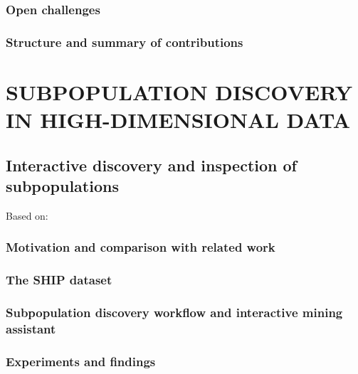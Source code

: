 \documentclass[
]{book}
\begin{document}
\hypertarget{open-challenges}{%
\section{Open challenges}\label{open-challenges}}

\hypertarget{structure-and-summary-of-contributions}{%
\section{Structure and summary of contributions}\label{structure-and-summary-of-contributions}}

\hypertarget{part-subpopulation-discovery-in-high-dimensional-data}{%
\part{SUBPOPULATION DISCOVERY IN HIGH-DIMENSIONAL DATA}\label{part-subpopulation-discovery-in-high-dimensional-data}}

\hypertarget{imm}{%
\chapter{Interactive discovery and inspection of subpopulations}\label{imm}}

Based on: \autocite{Niemann:ESWA2014}

\hypertarget{motivation-and-comparison-with-related-work}{%
\section{Motivation and comparison with related work}\label{motivation-and-comparison-with-related-work}}

\hypertarget{the-ship-dataset}{%
\section{The SHIP dataset}\label{the-ship-dataset}}

\hypertarget{subpopulation-discovery-workflow-and-interactive-mining-assistant}{%
\section{Subpopulation discovery workflow and interactive mining assistant}\label{subpopulation-discovery-workflow-and-interactive-mining-assistant}}

\hypertarget{experiments-and-findings}{%
\section{Experiments and findings}\label{experiments-and-findings}}
\end{document}
